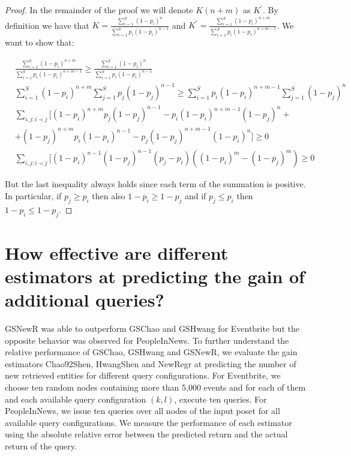 \documentclass[conference]{IEEEtran}
\begin{document}
\begin{proof}
In the remainder of the proof we will denote $K(n+m)$ as $K^{\prime}$. By definition we have that $K = \frac{\sum_{i=1}^S (1-p_i)^n}{\sum_{i=1}^S p_i(1-p_i)^{n-1}}$ and $K^{\prime} = \frac{\sum_{i=1}^S (1-p_i)^{n+m}}{\sum_{i=1}^S p_i(1-p_i)^{n+m-1}}$. We want to show that:

{\small
\begin{align}
&\frac{\sum_{i=1}^S (1-p_i)^{n+m}}{\sum_{i=1}^S p_i(1-p_i)^{n+m-1}} \geq \frac{\sum_{i=1}^S (1-p_i)^n}{\sum_{i=1}^S p_i(1-p_i)^{n-1}} \nonumber \\
&\sum_{i=1}^S (1-p_i)^{n+m}\sum_{j=1}^S p_j(1-p_j)^{n-1} \geq \sum_{i=1}^S p_i(1-p_i)^{n+m-1}\sum_{j=1}^S (1-p_j)^n\nonumber \\
&\sum_{i,j:i\prec j}[(1-p_i)^{n+m}p_j(1-p_j)^{n-1} - p_i(1-p_i)^{n+m-1}(1-p_j)^n + \nonumber \\
& + (1-p_j)^{n+m}p_i(1-p_i)^{n-1} - p_j(1-p_j)^{n+m-1}(1-p_i)^n] \geq 0 \nonumber \\
&\sum_{i,j:i\prec j}[(1-p_i)^{n-1}(1-p_j)^{n-1}(p_j-p_i)((1-p_i)^{m} - (1-p_j)^{m}) \geq 0
\end{align}}

But the last inequality always holds since each term of the summation is positive. In particular, if $p_j \geq p_i$ then
also $1-p_i \geq 1-p_j$ and if $p_j \leq p_i$ then $1-p_i \leq 1-p_j$.
\end{proof}

\section{How effective are different estimators at predicting the gain of additional queries?}
GSNewR was able to outperform GSChao and GSHwang for Eventbrite but the opposite behavior was observed for PeopleInNews. To further understand the relative performance of GSChao, GSHwang and GSNewR, we evaluate the gain estimators Chao92Shen, HwangShen and NewRegr at predicting the number of new retrieved entities for different query configurations. For Eventbrite, we choose ten random nodes containing more than 5,000 events and for each of them and each available query configuration $(k,l)$, execute ten queries. For PeopleInNews, we issue ten queries over all nodes of the input poset for all available query configurations.  We measure the performance of each estimator using the absolute relative error between the predicted return and the actual return of the query.
\end{document}
